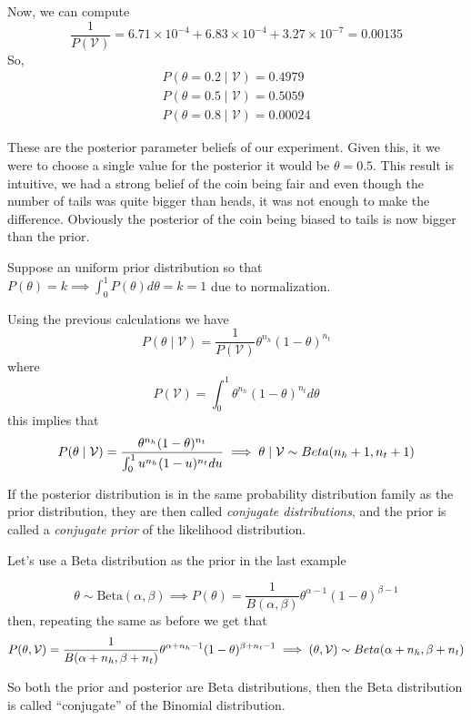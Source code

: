 \begin{exampleth}
Now, we can compute
\[
   \frac{1}{P(\mathcal{V})} =  6.71\times10^{-4} +   6.83\times10^{-4} +
   3.27\times10^{-7} = 0.00135
 \]
 So,
\begin{gather*}
  P(\theta = 0.2  \mid  \mathcal{V}) = 0.4979\\
  P(\theta = 0.5  \mid  \mathcal{V}) = 0.5059\\
  P(\theta = 0.8  \mid  \mathcal{V}) = 0.00024
\end{gather*}

These are the posterior parameter beliefs of our experiment. Given this, it we
were to choose a single value for the posterior it would be \(\theta = 0.5\).
This result is intuitive, we had a strong belief of the coin being fair
and even though the number of tails was quite bigger than heads, it
was not enough to make the difference. Obviously the posterior of the coin being
biased to tails is now bigger than the prior.

Suppose an uniform prior distribution so that \(P(\theta) = k \implies \int_0^1 P(\theta) d\theta
= k = 1\) due to normalization.

Using the previous calculations we have
\[
  P(\theta \mid  \mathcal{V}) = \frac{1}{P(\mathcal{V})} \theta^{n_h}(1-\theta)^{n_t}
\]
where
\[
  P(\mathcal{V}) = \int_0^1 \theta^{n_h}(1-\theta)^{n_t} d\theta
\]
this implies that
\[
  P(\theta \mid \mathcal{V}) = \frac{\theta^{n_h}(1-\theta)^{n_t} }{ \int_0^1 u^{n_h}(1-u)^{n_t}
    du} \implies \theta \mid \mathcal{V} \sim Beta(n_h + 1, n_t + 1)
\]
\end{exampleth}

\begin{definition}
If the posterior distribution is in the same probability distribution family as
the prior distribution, they are then called \emph{conjugate distributions}, and
the prior is called a \emph{conjugate prior} of the likelihood distribution.
\end{definition}

Let's use a Beta distribution as the prior in the last example

\[
  \theta \sim \text{Beta}(\alpha, \beta) \implies P(\theta) = \frac{1}{B(\alpha, \beta)}\theta^{\alpha - 1}(1 - \theta)^{\beta -
    1}
\]
then, repeating the same as before we get that
\[
  P(\theta, \mathcal{V}) = \frac{1}{B(\alpha + n_h, \beta + n_t)}\theta^{\alpha
    + n_h - 1}(1 - \theta)^{\beta + n_t - 1} \implies (\theta, \mathcal{V}) \sim Beta(\alpha + n_h, \beta + n_t)
\]

So both the prior and posterior are Beta distributions, then the Beta
distribution is called ``conjugate'' of the Binomial distribution.


